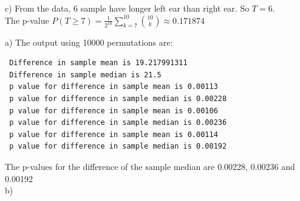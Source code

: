 \documentclass[11pt]{article}
\newenvironment{problem}[2][Problem]{\begin{trivlist}
\item[\hskip \labelsep {\bfseries #1}\hskip \labelsep {\bfseries #2.}]}{\end{trivlist}}
\begin{document}
c) From the data, 6 sample have longer left ear than right ear. So $T = 6$.\\ The p-value $P(T \geq 7) =\frac{1}{2^{10}} \sum_{k = 7}^{10} {10 \choose k} \approx 0.171874 $

\begin{problem}{4}
\end{problem}
 a) The output using 10000 permutations are: 
 \begin{verbatim}
 Difference in sample mean is 19.217991311
 Difference in sample median is 21.5
 p value for difference in sample mean is 0.00113
 p value for difference in sample median is 0.00228
 p value for difference in sample mean is 0.00106
 p value for difference in sample median is 0.00236
 p value for difference in sample mean is 0.00114
 p value for difference in sample median is 0.00192
 \end{verbatim}
 The p-values for the difference of the sample median are 0.00228, 0.00236 and 0.00192\\
 
 b) 
 
\end{document}
